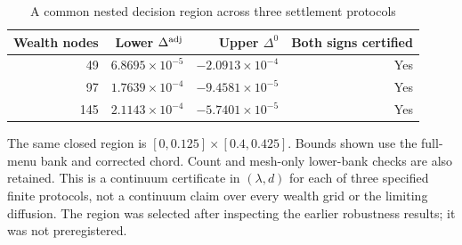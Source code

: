 \begin{table}[htbp]
\centering
\caption{A common nested decision region across three settlement protocols}\label{tab:r8_nested}
\small
\begin{tabular}{rrrr}
\toprule
Wealth nodes & Lower $\Delta^{\rm adj}$ & Upper $\Delta^0$ & Both signs certified \\
\midrule
49 & $6.8695\times10^{-5}$ & $-2.0913\times10^{-4}$ & Yes \\
97 & $1.7639\times10^{-4}$ & $-9.4581\times10^{-5}$ & Yes \\
145 & $2.1143\times10^{-4}$ & $-5.7401\times10^{-5}$ & Yes \\
\bottomrule
\end{tabular}
\par\vspace{3pt}\begin{minipage}{0.96\textwidth}\footnotesize The same closed region is $[0,0.125]\times[0.4,0.425]$. Bounds shown use the full-menu bank and corrected chord. Count and mesh-only lower-bank checks are also retained. This is a continuum certificate in $(\lambda,d)$ for each of three specified finite protocols, not a continuum claim over every wealth grid or the limiting diffusion. The region was selected after inspecting the earlier robustness results; it was not preregistered.\end{minipage}
\end{table}
